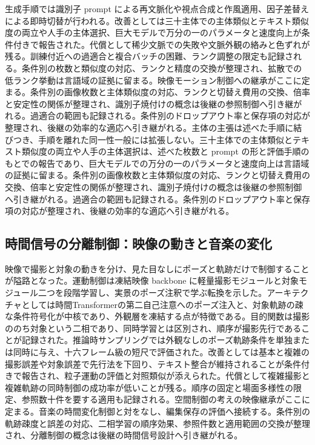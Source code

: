 \documentclass[lualatex,a4paper,10pt]{jlreq}
\begin{document}
生成手順では識別子 prompt による再文脈化や視点合成と作風適用、因子差替えによる即時切替が行われる\autocite{btd039,btd040}。改善としては三十主体での主体類似とテキスト類似度の両立や人手の主体選択、巨大モデルで万分の一のパラメータと速度向上が条件付きで報告された\autocite{btd039,btd040}。代償として稀少文脈での失敗や文脈外観の絡みと色ずれが残る\autocite{btd039}。訓練付近への過適合と複合バッチの困難、ランク調整の限定も記録される\autocite{btd040}。条件別の枚数と類似度の対応、ランクと精度の交換が整理され、拡散での低ランク挙動は言語域の証拠に留まる\autocite{btd040}。映像モーション制御への継承がここに定まる。条件別の画像枚数と主体類似度の対応、ランクと切替え費用の交換、倍率と安定性の関係が整理され、識別子焼付けの概念は後継の参照制御へ引き継がれる\autocite{btd039}。過適合の範囲も記録される。条件別のドロップアウト率と保存項の対応が整理され、後継の効率的な適応へ引き継がれる。主体の主張は述べた手順に結びつき、手順を離れた同一性一般には拡張しない。三十主体での主体類似とテキスト類似度の両立や人手の主体選択は、述べた枚数と prompt の形と評価手順のもとでの報告であり\autocite{btd039}、巨大モデルでの万分の一のパラメータと速度向上は言語域の証拠に留まる\autocite{btd040}。条件別の画像枚数と主体類似度の対応、ランクと切替え費用の交換、倍率と安定性の関係が整理され、識別子焼付けの概念は後継の参照制御へ引き継がれる\autocite{btd039}。過適合の範囲も記録される。条件別のドロップアウト率と保存項の対応が整理され、後継の効率的な適応へ引き継がれる。

\subsection{時間信号の分離制御：映像の動きと音楽の変化}
映像で撮影と対象の動きを分け、見た目なしにポーズと軌跡だけで制御することが隘路となった。運動制御は凍結映像 backbone に軽量撮影モジュールと対象モジュール二つを段階学習し、実景のポーズ注釈で学ぶ転換を示した\autocite{btd042}。アーキテクチャとしては時間Transformerの第二自己注意へのポーズ注入と、対象軌跡の疎な条件符号化が中核であり、外観層を凍結する点が特徴である\autocite{btd042}。目的関数は撮影ののち対象という二相であり、同時学習とは区別され、順序が撮影先行であることが記録された\autocite{btd042}。推論時サンプリングでは外観なしのポーズ軌跡条件を単独または同時に与え、十六フレーム級の短尺で評価された\autocite{btd042}。改善としては基本と複雑の撮影誤差や対象誤差で先行法を下回り、テキスト整合が維持されることが条件付きで報告され、粒子運動の評価と対照類似が添えられた\autocite{btd042}。代償として複雑撮影と複雑軌跡の同時制御の成功率が低いことが残る\autocite{btd042}。順序の固定と場面多様性の限定、参照数十件を要する適用も記録される。空間制御の考えの映像継承がここに定まる。音楽の時間変化制御と対をなし、編集保存の評価へ接続する。条件別の軌跡疎度と誤差の対応、二相学習の順序効果、参照件数と適用範囲の交換が整理され、分離制御の概念は後継の時間信号設計へ引き継がれる\autocite{btd042}。
\end{document}
